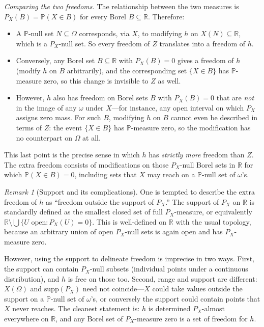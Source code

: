 \documentclass[a4paper,oneside,12pt]{extarticle}
\theoremstyle{plain}
\theoremstyle{definition}
\theoremstyle{remark}
\newtheorem{remark}[proposition]{Remark}
\newcommand*{\mP}{\mathbb{P}}
\newcommand*{\mR}{\mathbb{R}}
\begin{document}
\textit{Comparing the two freedoms.}
The relationship between the two measures is $P_X(B) = \mP(X \in B)$
for every Borel $B \subseteq \mR$. Therefore:
\begin{itemize}
  \item A $\mP$-null set $N \subseteq \Omega$ corresponds, via $X$,
        to modifying $h$ on $X(N) \subseteq \mR$, which is a
        $P_X$-null set. So every freedom of $Z$ translates into a
        freedom of $h$.
  \item Conversely, any Borel set $B \subseteq \mR$ with $P_X(B) = 0$
        gives a freedom of $h$ (modify $h$ on $B$ arbitrarily), and
        the corresponding set $\{X \in B\}$ has $\mP$-measure zero,
        so this change is invisible to $Z$ as well.
  \item However, $h$ also has freedom on Borel sets $B$ with
        $P_X(B) = 0$ that are \emph{not} in the image of any $\omega$
        under $X$---for instance, any open interval on which $P_X$
        assigns zero mass. For such $B$, modifying $h$ on $B$ cannot
        even be described in terms of $Z$: the event $\{X \in B\}$ has
        $\mP$-measure zero, so the modification has no counterpart on
        $\Omega$ at all.
\end{itemize}

This last point is the precise sense in which $h$ has \emph{strictly
more} freedom than $Z$. The extra freedom consists of modifications
on those $P_X$-null Borel sets in $\mR$ for which $\mP(X \in B) = 0$,
including sets that $X$ may reach on a $\mP$-null set of $\omega$'s.

\begin{remark}[Support and its complications]
One is tempted to describe the extra freedom of $h$ as ``freedom
outside the support of $P_X$.'' The support of $P_X$ on $\mR$ is
standardly defined as the smallest closed set of full $P_X$-measure,
or equivalently $\mR \setminus \bigcup\{U \text{ open} : P_X(U)=0\}$.
This is well-defined on $\mR$ with the usual topology, because an
arbitrary union of open $P_X$-null sets is again open and has
$P_X$-measure zero.

However, using the support to delineate freedom is imprecise in two
ways. First, the support can contain $P_X$-null subsets (individual
points under a continuous distribution), and $h$ is free on those too.
Second, range and support are different: $X(\Omega)$ and
$\mathrm{supp}(P_X)$ need not coincide---$X$ could take values outside
the support on a $\mP$-null set of $\omega$'s, or conversely the
support could contain points that $X$ never reaches. The cleanest
statement is: $h$ is determined $P_X$-almost everywhere on $\mR$, and
any Borel set of $P_X$-measure zero is a set of freedom for $h$.
\end{remark}
\end{document}
